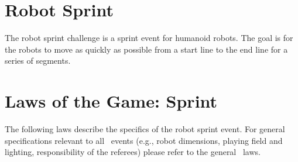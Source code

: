 \documentclass[12pt]{hurocup}
\begin{document}
\newpage

\section{Robot Sprint}
\label{sec:robot-sprint}

The robot sprint challenge is a sprint event for humanoid robots. The
goal is for the robots to move as quickly as possible from a start
line to the end line for a series of segments.

\section{Laws of the Game: Sprint}
\label{sec:laws-sprint}

The following laws describe the specifics of the robot sprint event. For
general specifications relevant to all \HuroCup\ events (e.g., robot
dimensions, playing field and lighting, responsibility of the
referees) please refer to the general \HuroCup\ laws.

\label{law:field-of-play}
\end{document}
